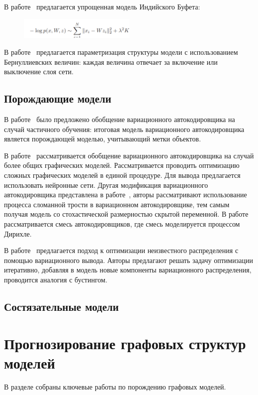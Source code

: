 В работе~\cite{cib_simple} предлагается упрощенная модель Индийского Буфета:
\begin{figure}[H]
\includegraphics[width=0.5\textwidth]{./plots/arch_review_figs/cib_simple.png}
\end{figure}

В работе~\cite{shirakawa2018dynamic} предлагается параметризация структуры модели с использованием Бернуллиевских величин:
каждая величина отвечает за включение или выключение слоя сети.



\subsection{Порождающие модели}
В работе~\cite{Kingma} было предложено обобщение вариационного автокодировщика на случай частичного обучения: 
итоговая модель вариационного автокодировщика является порождающей моделью, учитывающий метки объектов. 

В работе~\cite{vae_graph} рассматривается обобщение вариационного автокодировщика на случай более общих графических моделей. Рассматривается проводить оптимизацию сложных графических моделей в единой процедуре. Для вывода предлагается использовать нейронные сети.
Другая модификация вариационного автокодировщика представлена в работе~\cite{vae_stick}, авторы рассматривают использование процесса сломанной трости в вариационном автокодировщике, тем самым получая модель со стохастической размерностью скрытой переменной. В работе~\cite{vae_mix} рассматривается смесь автокодировщиков, где смесь моделируется процессом Дирихле.


В работе~\cite{var_boost} предлагается подход к оптимизации неизвестного распределения с помощью вариационного вывода. Авторы предлагают решать задачу оптимизации итеративно, добавляя в модель новые компоненты вариационного распределения, проводится аналогия с бустингом.
\subsection{Состязательные модели}

\section{Прогнозирование графовых структур моделей}
В разделе собраны ключевые работы по порождению графовых моделей.

